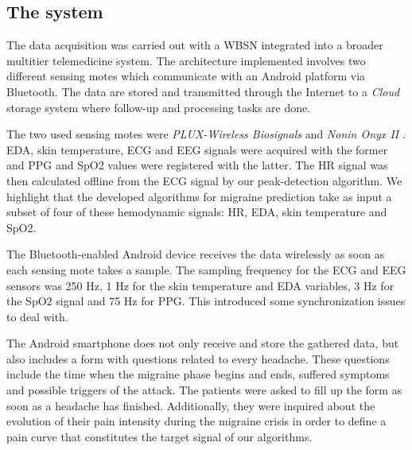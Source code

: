 \subsection{The system}
\label{subsec:thesystem}

The data acquisition was carried out with a WBSN integrated into a
broader multitier telemedicine system. The architecture implemented
involves two different sensing motes which communicate with an Android
platform via Bluetooth. The data are stored and transmitted through
the Internet to a \emph{Cloud} storage system where follow-up and
processing tasks are done.

The two used sensing motes were \emph{PLUX-Wireless Biosignals}
\cite{BIOPLUXws} and \emph{Nonin Onyx II} \cite{NONINws}. EDA, skin
temperature, ECG and EEG signals were acquired with the former and PPG
and SpO2 values were registered with the latter. The HR signal was
then calculated offline from the ECG signal by our peak-detection
algorithm. We highlight that the developed algorithms for migraine
prediction take as input a subset of four of these hemodynamic
signals: HR, EDA, skin temperature and SpO2.

The Bluetooth-enabled Android device receives the data wirelessly as
soon as each sensing mote takes a sample.  The sampling frequency for
the ECG and EEG sensors was 250 Hz, 1 Hz for the skin temperature and
EDA variables, 3 Hz for the SpO2 signal and 75 Hz for PPG.  This
introduced some synchronization issues to deal with.

The Android smartphone does not only receive and store the gathered
data, but also includes a form with questions related to every
headache. These questions include the time when the migraine phase
begins and ends, suffered symptoms and possible triggers of the
attack. The patients were asked to fill up the form as soon as a
headache has finished. Additionally, they were inquired about the
evolution of their pain intensity during the migraine crisis in order
to define a pain curve that constitutes the target signal of our
algorithms.
